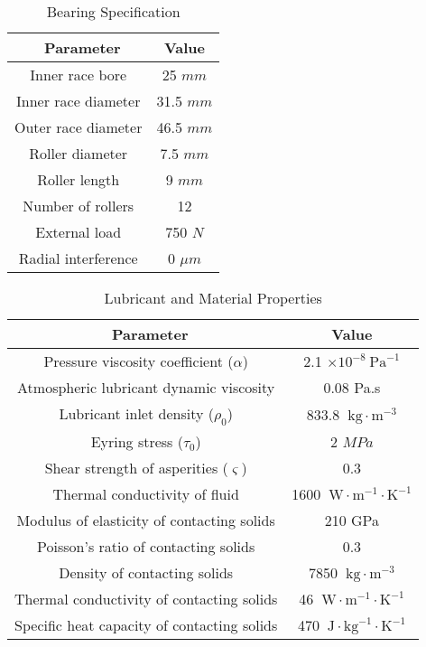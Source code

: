 \begin{table*}
	\caption{Bearing Specification}
	\label{Bearing Specification}
	\centering
	\renewcommand{\arraystretch}{1.5}%
	\begin{tabular}{|c|c|}
		\hline
		\ \textbf{Parameter} & \textbf{Value} \\ [0.5ex]
		\hline
		Inner race bore & 25 $mm$ \\ [0.5ex]
		\hline
		Inner race diameter & 31.5 $mm$ \\ [0.5ex]
		\hline
		Outer race diameter & 46.5 $mm$ \\ [0.5ex]
		\hline
		Roller diameter & 7.5 $mm$ \\ [0.5ex]
		\hline
		Roller length & 9 $mm$ \\ [0.5ex]
		\hline
		Number of rollers & 12 \\ [0.5ex]
		\hline
		External load & 750 $N$ \\ [0.5ex]
		\hline
		Radial interference & 0 $\mu m$ \\ [0.5ex]
		\hline
	\end{tabular}
\end{table*}

\begin{table*}
	\caption{Lubricant and Material Properties}
	\label{Lubricant and Material Properties}
	\centering
	\renewcommand{\arraystretch}{1.5}%
	\begin{tabular}{|c|c|}
		\hline
		\ \textbf{Parameter} & \textbf{Value} \\ [0.5ex]
		\hline
		Pressure viscosity coefficient ($\alpha$) & 2.1 $\times 10^{-8}\mathrm{~Pa}^{-1}$ \\ [0.5ex]
		\hline
		Atmospheric lubricant dynamic viscosity & 0.08 Pa.s \\ [0.5ex]
		\hline
		Lubricant inlet density ($\rho_0$) & 833.8 $\mathrm{~kg}\cdot\mathrm{m}^{-3}$ \\ [0.5ex]
		\hline
		Eyring stress ($\tau_0$) & 2 $MPa$ \\ [0.5ex]
		\hline
		Shear strength of asperities ($\varsigma$) & 0.3 \\ [0.5ex]
		\hline
		Thermal conductivity of fluid & 1600 $\mathrm{~W}\cdot\mathrm{m}^{-1}\cdot\mathrm{K}^{-1}$ \\ [0.5ex]
		\hline
		Modulus of elasticity of contacting solids & 210 GPa \\ [0.5ex]
		\hline
		Poisson’s ratio of contacting solids & 0.3 \\ [0.5ex]
		\hline
        Density of contacting solids & 7850 $\mathrm{~kg}\cdot\mathrm{m}^{-3}$ \\ [0.5ex]
		\hline
		Thermal conductivity of contacting solids & 46 $\mathrm{~W}\cdot\mathrm{m}^{-1}\cdot\mathrm{K}^{-1}$ \\ [0.5ex]
		\hline
		Specific heat capacity of contacting solids & 470 $\mathrm{~J}\cdot\mathrm{kg}^{-1}\cdot\mathrm{K}^{-1}$ \\ [0.5ex]
		\hline
	\end{tabular}
\end{table*}

